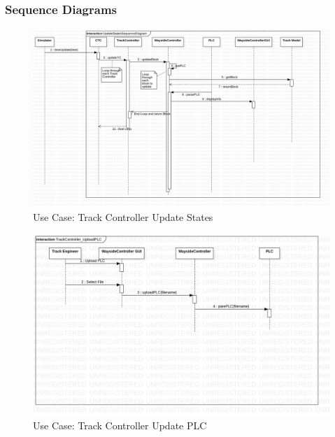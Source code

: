 \documentclass{article}
\begin{document}
    \subsubsection{Sequence Diagrams}
    \begin{figure}[H]
        \centering
        \includegraphics[width=\textwidth]{./SequenceDiagrams/UpdateStatesSequenceDiagram.png}
        \caption{Use Case: Track Controller Update States}
        \label{fig: Use Case: Track Controller Update States}
    \end{figure}
    \begin{figure}[H]
        \centering
        \includegraphics[width=\textwidth]{./SequenceDiagrams/TrackController_UploadPLC.png}
        \caption{Use Case: Track Controller Update PLC}
        \label{fig: Use Case: Track Controller Update PLC}
    \end{figure}
\end{document}
